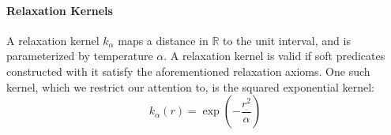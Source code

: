 
\paragraph{Relaxation Kernels}A relaxation kernel $k_\alpha$ maps a distance in $\mathbb{R}$ to the unit interval, and is parameterized by temperature $\alpha$.
A relaxation kernel is valid if soft predicates constructed with it satisfy the aforementioned relaxation axioms.
One such kernel, which we restrict our attention to, is the squared exponential kernel:
\begin{equation}
k_{\alpha}(r) = \exp\left(-\frac{r^2}{\alpha}\right)
\end{equation}








